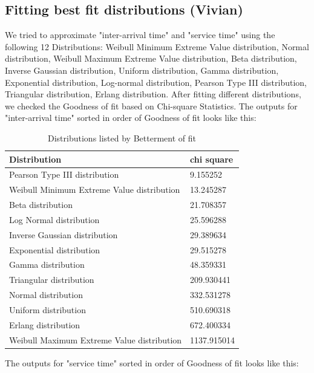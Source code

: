 \documentclass{article}
\begin{document}
\subsection{Fitting best fit distributions (Vivian)}

We tried to approximate "inter-arrival time" and "service time" using the following 12 Distributions: Weibull Minimum Extreme Value distribution, Normal distribution, Weibull Maximum Extreme Value distribution, Beta distribution, Inverse Gaussian distribution, Uniform distribution, Gamma distribution, Exponential distribution, Log-normal distribution, Pearson Type III distribution, Triangular distribution, Erlang distribution. After fitting different distributions, we checked the Goodness of fit based on Chi-square Statistics. The outputs for "inter-arrival time" sorted in order of Goodness of fit looks like this: 

\begin{table}[H]
    \centering
    \caption{Distributions listed by Betterment of fit}
    \begin{tabu}{*{2}{X[c]}}
        \toprule
        \textbf{Distribution} & \textbf{chi square}\\
        \midrule
        Pearson Type III distribution & 9.155252\\
        Weibull Minimum Extreme Value distribution & 13.245287\\
        Beta distribution & 21.708357\\
        Log Normal distribution & 25.596288\\
        Inverse Gaussian distribution & 29.389634\\
        Exponential distribution & 29.515278\\
        Gamma distribution & 48.359331\\
        Triangular distribution & 209.930441\\
        Normal distribution & 332.531278\\
        Uniform distribution & 510.690318\\
        Erlang distribution & 672.400334\\
        Weibull Maximum Extreme Value distribution & 1137.915014\\
        \bottomrule
    \end{tabu}
    \label{tab:Inter-arrival Best Fit}
\end{table}

The outputs for "service time" sorted in order of Goodness of fit looks like this:
\end{document}
